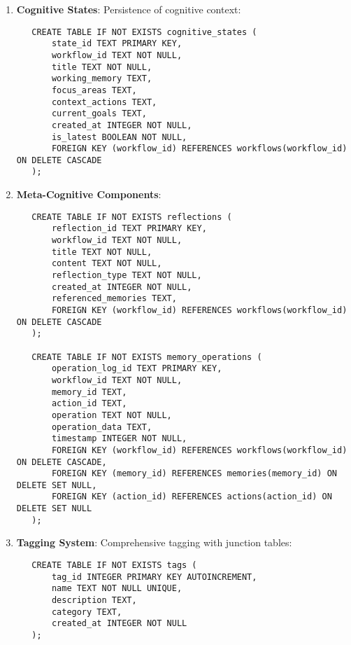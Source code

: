 \documentclass[12pt,a4paper]{article}
\begin{document}
\begin{enumerate}[label=\arabic*.]
    \item \textbf{Cognitive States}: Persistence of cognitive context:
    \begin{pageablecode}
    \begin{verbatim}
   CREATE TABLE IF NOT EXISTS cognitive_states (
       state_id TEXT PRIMARY KEY,
       workflow_id TEXT NOT NULL,
       title TEXT NOT NULL,
       working_memory TEXT,
       focus_areas TEXT,
       context_actions TEXT,
       current_goals TEXT,
       created_at INTEGER NOT NULL,
       is_latest BOOLEAN NOT NULL,
       FOREIGN KEY (workflow_id) REFERENCES workflows(workflow_id) ON DELETE CASCADE
   );
    \end{verbatim}
    \end{pageablecode}

    \item \textbf{Meta-Cognitive Components}:
    \begin{pageablecode}
    \begin{verbatim}
   CREATE TABLE IF NOT EXISTS reflections (
       reflection_id TEXT PRIMARY KEY,
       workflow_id TEXT NOT NULL,
       title TEXT NOT NULL,
       content TEXT NOT NULL,
       reflection_type TEXT NOT NULL,
       created_at INTEGER NOT NULL,
       referenced_memories TEXT,
       FOREIGN KEY (workflow_id) REFERENCES workflows(workflow_id) ON DELETE CASCADE
   );

   CREATE TABLE IF NOT EXISTS memory_operations (
       operation_log_id TEXT PRIMARY KEY,
       workflow_id TEXT NOT NULL,
       memory_id TEXT,
       action_id TEXT,
       operation TEXT NOT NULL,
       operation_data TEXT,
       timestamp INTEGER NOT NULL,
       FOREIGN KEY (workflow_id) REFERENCES workflows(workflow_id) ON DELETE CASCADE,
       FOREIGN KEY (memory_id) REFERENCES memories(memory_id) ON DELETE SET NULL,
       FOREIGN KEY (action_id) REFERENCES actions(action_id) ON DELETE SET NULL
   );
    \end{verbatim}
    \end{pageablecode}

    \item \textbf{Tagging System}: Comprehensive tagging with junction tables:
    \begin{pageablecode}
    \begin{verbatim}
   CREATE TABLE IF NOT EXISTS tags (
       tag_id INTEGER PRIMARY KEY AUTOINCREMENT,
       name TEXT NOT NULL UNIQUE,
       description TEXT,
       category TEXT,
       created_at INTEGER NOT NULL
   );


\end{verbatim}
\end{pageablecode}
\end{enumerate}
\end{document}
